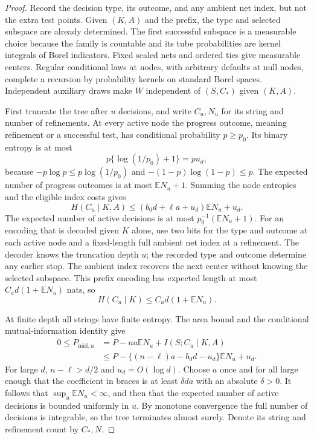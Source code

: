 \begin{proof}
Record the decision type, its outcome, and any ambient net index,
but not the extra test points.  Given \((K,A)\) and the prefix, the
type and selected subspace are already determined.  The first
successful subspace is a measurable choice because the family is
countable and its tube probabilities are kernel integrals of Borel
indicators.  Fixed scaled nets and ordered ties give measurable
centers.  Regular conditional laws at nodes, with arbitrary defaults
at null nodes, complete a recursion by probability kernels on
standard Borel spaces.  Independent auxiliary draws make
\(W\) independent of \((S,C_*)\) given \((K,A)\).

First truncate the tree after \(u\) decisions, and write \(C_u,N_u\)
for its string and number of refinements.  At every active node the
progress outcome, meaning refinement or a successful test, has
conditional probability \(p\ge p_0\).  Its binary entropy is at most
\[
 p\{\log(1/p_0)+1\}=p u_d,
\]
because \(-p\log p\le p\log(1/p_0)\) and
\(-(1-p)\log(1-p)\le p\).  The expected number of progress outcomes
is at most \(\mathbb E N_u+1\).  Summing the node entropies and the
eligible index costs gives
\begin{equation}
 H(C_u\mid K,A)
 \le(b_0d+\ell a+u_d)\mathbb E N_u+u_d.
 \label{l:sep:truncated-code}
\end{equation}
The expected number of active decisions is at most
\(p_0^{-1}(\mathbb E N_u+1)\).  For an encoding that is decoded
given \(K\) alone, use two bits for the type and outcome at each
active node and a fixed-length full ambient net index at a refinement.
The decoder knows the truncation depth \(u\); the recorded type and
outcome determine any earlier stop.  The ambient index recovers the
next center without knowing the selected subspace.
This prefix encoding has expected length at most
\(C_a d(1+\mathbb E N_u)\) nats, so
\begin{equation}
 H(C_u\mid K)\le C_a d(1+\mathbb E N_u).
 \label{l:sep:truncated-ambient}
\end{equation}

At finite depth all strings have finite entropy.  The area bound and
the conditional mutual-information identity give
\begin{align*}
 0\le P_{\mathrm{mid},u}
 &=P-na\mathbb E N_u+I(S;C_u\mid K,A)\\
 &\le P-\{(n-\ell)a-b_0d-u_d\}\mathbb E N_u+u_d.
\end{align*}
For large \(d\), \(n-\ell>d/2\) and \(u_d=O(\log d)\).
Choose \(a\) once and for all large enough that the coefficient in
braces is at least \(\delta da\) with an absolute \(\delta>0\).
It follows that \(\sup_u\mathbb E N_u<\infty\), and then that the
expected number of active decisions is bounded uniformly in \(u\).
By monotone convergence the full number of decisions is integrable,
so the tree terminates almost surely.  Denote its string and
refinement count by \(C_*,N\).


\end{proof}
